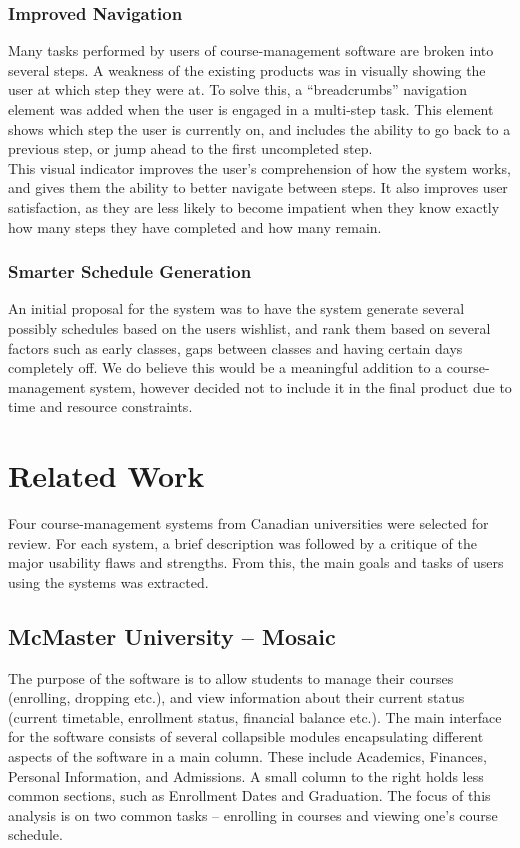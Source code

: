\documentclass[10pt]{article}
\begin{document}
\begin{multicols}{2}
\subsubsection*{Improved Navigation}
Many tasks performed by users of course-management software are broken into 
several steps. A weakness of the existing products was in visually showing the 
user at which step they were at. To solve this, a ``breadcrumbs'' navigation element was added  when the user is engaged in a multi-step task. This element shows which step the user is currently on, and includes the ability to 
go back to a previous step, or jump ahead to the first uncompleted step.\\

This visual indicator improves the user's comprehension of how the system 
works, and gives them the ability to better navigate between steps. It also improves user satisfaction, 
as they are less likely to become impatient when they know exactly 
how many steps they have completed and how many remain. 

\subsubsection*{Smarter Schedule Generation}
An initial proposal for the system was to have the system generate several possibly schedules based on the users wishlist, and rank them based on several factors such as early classes, gaps between classes and having certain days completely off. We do believe this would be a meaningful addition to a course-management system, however decided not to include it in the final product due to time and resource constraints.

\section*{Related Work}
Four course-management systems from Canadian universities were selected for 
review. For each system, a brief description was followed by a critique of 
the major usability flaws and strengths. From this, the main goals and tasks of 
users using the systems was extracted. 

\subsection*{McMaster University -- Mosaic}
The purpose of the software is to allow students to manage their courses 
(enrolling, dropping etc.), and view information about their current status 
(current timetable, enrollment status, financial balance etc.). The main 
interface for the software consists of several collapsible modules 
encapsulating different aspects of the software in a main column. These include 
Academics, Finances, Personal Information, and Admissions. A small column to 
the right holds less common sections, such as Enrollment Dates and Graduation. 
The focus of this analysis is on two common tasks -- enrolling in courses and 
viewing one's course schedule.


\end{multicols}
\end{document}
